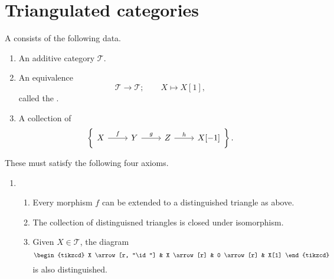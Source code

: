 \documentclass[main.tex]{subfiles}
\begin{document}
\chapter{Triangulated categories}
\label{ch:triangulated_categories}

\begin{definition}
  \label{def:triangulated_category}
  A  consists of the following data.
  \begin{enumerate}
    \item An additive category $\mathcal{T}$.

    \item An equivalence 
      \begin{equation*}
        \mathcal{T} \to \mathcal{T};\qquad X \mapsto X[1],
      \end{equation*}
      called the .

    \item A collection of 
      \begin{equation*}
        \left\{ 
          \begin{tikzcd}
            X
            \arrow[r, "f"]
            & Y
            \arrow[r, "g"]
            & Z
            \arrow[r, "h"]
            & X[-1]
          \end{tikzcd}
        \right\}.
      \end{equation*}
  \end{enumerate}

  These must satisfy the following four axioms.
  \begin{enumerate}[label=(TR\arabic*), leftmargin=*]
    \item 
      \begin{enumerate}
        \item Every morphism $f$ can be extended to a distinguished triangle as above.

        \item The collection of distinguisned triangles is closed under isomorphism.

        \item Given $X \in \mathcal{T}$, the diagram
          \begin{equation*}
            \begin{tikzcd}
              X
              \arrow[r, "\id"]
              & X
              \arrow[r]
              & 0
              \arrow[r]
              & X[1]
            \end{tikzcd}
          \end{equation*}
          is also distinguished.
      \end{enumerate}


\end{enumerate}
\end{definition}
\end{document}
